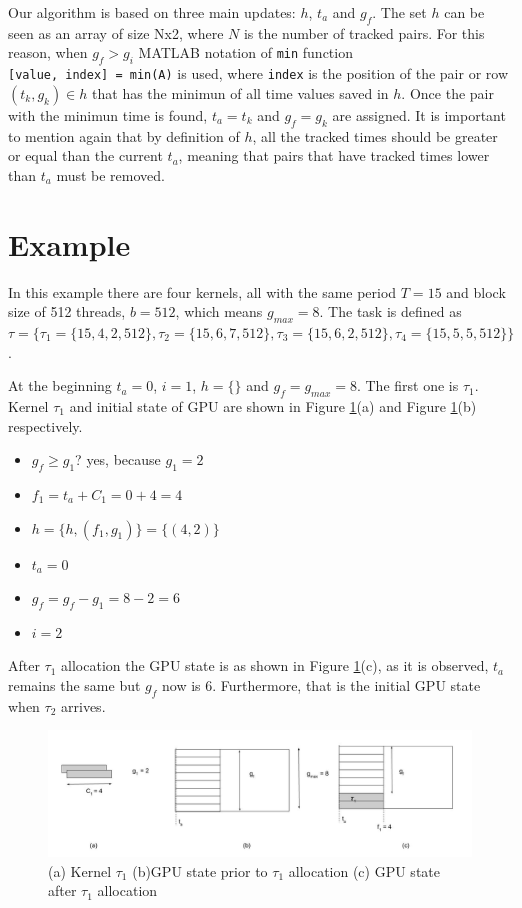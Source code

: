 \documentclass[
  12pt,
  a4paperpaper,
]{report}
\providecommand{\tightlist}{%
  \setlength{\itemsep}{0pt}\setlength{\parskip}{0pt}}
\begin{document}
Our algorithm is based on three main updates: \(h\), \(t_a\) and
\(g_f\). The set \(h\) can be seen as an array of size Nx2, where \(N\)
is the number of tracked pairs. For this reason, when \(g_f > g_i\) MATLAB notation of \texttt{min} function
\texttt{{[}value,\ index{]}\ =\ min(A)} is used, where \texttt{index} is the
position of the pair or row \((t_k, g_k) \in h\) that has the minimun of
all time values saved in \(h\). Once the pair with the minimun
time is found, \(t_a = t_k\) and \(g_f = g_k\) are assigned. It is important to
mention again that by definition of \(h\), all the tracked times should
be greater or equal than the current \(t_a\), meaning that pairs that
have tracked times lower than \(t_a\) must be removed.

\hypertarget{example}{%
\section{Example}\label{example}}

In this example there are four kernels, all with the same
period \(T = 15\) and block size of 512 threads, \(b = 512\), which
means \(g_{max} = 8\). The task is defined as
\(\tau = \{\tau_1 = \{15, 4, 2, 512\} , \tau_2 = \{15, 6,7,512\}, \tau_3 = \{15, 6,2,512\}, \tau_4 =\{ 15, 5,5,512\} \}\).

At the beginning \(t_a =0\), \(i=1\), \(h=\{\}\) and
\(g_f = g_{max} = 8\). The first one is \(\tau_1\). Kernel \(\tau_1\)
and initial state of GPU are shown in Figure \ref{img:ex_1}(a) and Figure
\ref{img:ex_1}(b) respectively.

\begin{itemize}
\tightlist
\item
  \(g_f \geq g_1\)? yes, because \(g_1 = 2\)
\item
  \(f_1 = t_a + C_1 = 0 + 4 = 4\)
\item
  \(h = \{h, (f_1, g_1)\} = \{ (4,2) \}\)
\item
  \(t_a = 0\)
\item
  \(g_f = g_f - g_1 = 8 - 2 = 6\)
\item
  \(i = 2\)
\end{itemize}

After \(\tau_1\) allocation the GPU state is as shown in Figure
\ref{img:ex_1}(c), as it is observed, \(t_a\) remains the same but
\(g_f\) now is 6. Furthermore, that is the initial GPU state when
\(\tau_2\) arrives.

\begin{figure}
\centering
\includegraphics{source/figures/ex_1.jpg}
\caption{(a) Kernel \(\tau_1\) (b)GPU state prior to \(\tau_1\)
allocation (c) GPU state after \(\tau_1\) allocation \label{img:ex_1}}
\end{figure}
\end{document}
